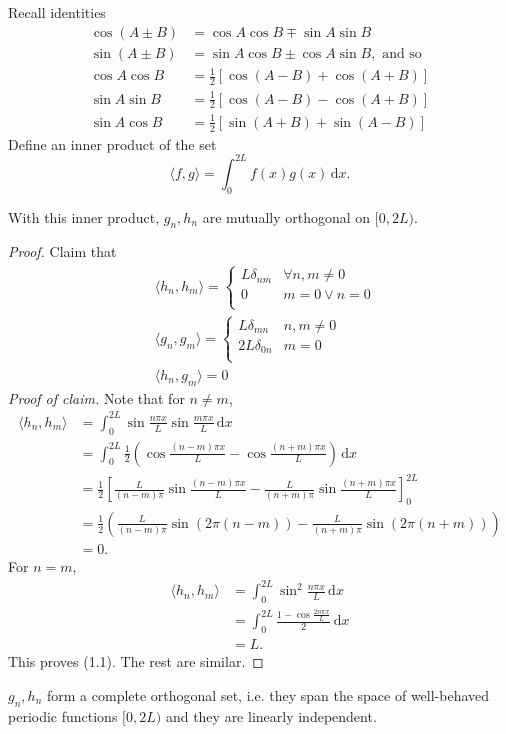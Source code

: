 \documentclass[a4paper]{article}
\begin{document}
Recall identities
\[
    \begin{aligned} \cos (A \pm B) &=\cos A \cos B \mp \sin A \sin B \\ \sin (A \pm B) &=\sin A \cos B \pm \cos A \sin B, \text { and so } \\ \cos A \cos B &=\frac{1}{2}[\cos (A-B)+\cos (A+B)] \\ \sin A \sin B &=\frac{1}{2}[\cos (A-B)-\cos (A+B)] \\ \sin A \cos B &=\frac{1}{2}[\sin (A+B)+\sin (A-B)] \end{aligned}
\]
Define an inner product of the set 
\[
    \langle f,g \rangle = \int_{0}^{2L} f(x)g(x)\,\mathrm{d}x.
\]
\begin{proposition}
    With this inner product, $g_n,h_n$ are mutually orthogonal on $ [0,2L) $.
\end{proposition}
\begin{proof}
    Claim that
    \begin{align}
        &\langle h_n,h_m \rangle = \begin{cases}
            L\delta_{nm} &\forall n,m\neq 0\\
            0 & m=0 \lor n=0\\
            \end{cases} \\
            &\langle g_n,g_m \rangle = \begin{cases}
            L \delta_{mn} &n,m\neq 0\\
            2L \delta_{0n} & m=0\\
            \end{cases} \\
            &\langle h_n,g_m \rangle =0
    \end{align}
    \textit{Proof of claim.} Note that for $n\neq m$,
    \begin{align*}
        \langle h_n,h_m \rangle &= \int_{0}^{2L} \sin \frac{n\pi x}{L} \sin \frac{m\pi x}{L} \,\mathrm{d}x\\ 
        &=\int_{0}^{2L} \frac{1}{2}\left( \cos \frac{(n-m)\pi x }{L}-\cos \frac{(n+m)\pi x}{L} \right) \,\mathrm{d}x\\ 
        &= \frac{1}{2} \left[ \frac{L}{(n-m)\pi}\sin \frac{(n-m)\pi x }{L}-\frac{L}{(n+m)\pi} \sin \frac{(n+m)\pi x }{L} \right]_0^{2L}\\ 
        &= \frac{1}{2}\left( \frac{L}{(n-m)\pi}\sin (2\pi(n-m))-\frac{L}{(n+m)\pi} \sin (2\pi(n+m)) \right)\\ 
        &=0.
    \end{align*}
    For $n=m$, 
    \begin{align*}
        \langle h_n,h_m \rangle &= \int_{0}^{2L} \sin^2 \frac{n\pi x}{L} \,\mathrm{d}x\\ 
        &= \int_{0}^{2L} \frac{1-\cos \frac{2n\pi x}{L}}{2} \,\mathrm{d}x\\ 
        &= L.
    \end{align*}
    This proves (1.1). The rest are similar.
\end{proof}
$g_n,h_n$ form a complete orthogonal set, i.e. they span the space of well-behaved periodic functions $ [0,2L) $ and they are linearly independent.
\end{document}
